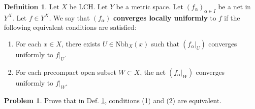 \documentclass[12pt,b5paper,notitlepage]{article}
\theoremstyle{definition}
\newtheorem{df}{Definition}[section]
\newtheorem{prob}{\color{red}Problem}[section]
\theoremstyle{plain}
\newcommand{\ovl}{\overline}
\newcommand{\Nbh}{\mathrm{Nbh}}
\newcommand{\Cl}{\mathrm{Cl}}
\numberwithin{equation}{section}
\begin{document}
\begin{comment}


Case 1: Assume that $X$ is compact Hausdorff.  Then $B=X\setminus W$ is compact by Cor. \ref{lb234}. Since $X$ is Hausdorff, for each $y\in B$ there exists $V_y\in\Nbh_X(y)$ such that $x\notin \ovl V_y$. (Recall Cor. \ref{lb243}.) Since $B$ is compact, there are $y_1,\dots,y_n\in B$ such that $B\subset V$ where $V=V_{y_1}\cup\cdots\cup V_{y_n}$. By \eqref{eq73}, $\ovl V=\ovl V_{y_1}\cup\cdots\cup \ovl V_{y_n}$. So $x\notin\ovl V$. Now $X\setminus V$ is a closed subset of $X$, and hence 

Let $U=X\setminus \ovl V$. Then $x\in U$. Since $U\subset X\setminus V$ and $X\setminus V$ is closed, $\ovl U\subset X\setminus V$, and hence $\ovl U\subset W$. Since $X$ is compact, $U$ is precompact.


Case 2: $X$ is LCH. Choose a precompact $\Omega\in\Nbh_X(x)$. By case 1 (applied to $\ovl\Omega$), and by the definition of subspace topology, there exists $V\in\Nbh_X(x)$ such that $x\in V\cap \ovl\Omega\subset\Cl_{\ovl\Omega}(V\cap \ovl\Omega)\subset W\cap\ovl\Omega$. By Rem. \ref{lb182}, we have $\Cl_{\ovl\Omega}(V\cap \ovl\Omega)= \ovl{V\cap\ovl\Omega}\cap\ovl\Omega$, which contains $\ovl{V\cap\Omega}$ since both $\ovl{V\cap\ovl\Omega}$ and $\ovl\Omega$ do. So $x\in U\subset\ovl U\subset W$ where $U=V\cap\Omega$. Since $\Omega$ is precompact, $U$ is precompact.
\end{comment}



\begin{df}\label{lb334}
Let $X$ be LCH. Let $Y$ be a metric space. Let $(f_\alpha)_{\alpha\in I}$ be a net in $Y^X$. Let $f\in Y^X$.  We say that $(f_\alpha)$  \textbf{converges locally uniformly}  to $f$ if the following equivalent conditions are satisfied:
\begin{enumerate}[label=(\arabic*)]
\item For each $x\in X$, there exists $U\in\Nbh_X(x)$ such that $(f_\alpha|_U)$ converges uniformly to $f|_U$.
\item For each precompact open subset $W\subset X$, the net $(f_\alpha|_W)$ converges uniformly to $f|_W$.
\end{enumerate}
\end{df}

\begin{prob}
Prove that in Def. \ref{lb334}, conditions (1) and (2) are equivalent. 
\end{prob}
\end{document}
